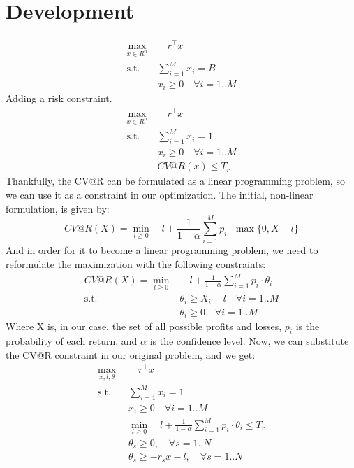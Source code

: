 \documentclass{article}
\begin{document}
\section*{Development}
\begin{equation}
  \begin{aligned}
  \max_{x \in R^n} &\quad \bar{r}^\intercal x\\
  \textrm{s.t.} \quad & \sum_{i=1}^M x_i = B\\
    & x_i \geq 0 \quad \forall i=1..M
  \end{aligned}
\end{equation}
Adding a risk constraint.
\begin{equation}
  \begin{aligned}
  \max_{x \in R^n} &\quad \bar{r}^\intercal x\\
  \textrm{s.t.} \quad & \sum_{i=1}^M x_i = 1\\
    & x_i \geq 0 \quad \forall i=1..M\\
    & CV@R(x) \leq T_r
  \end{aligned}
\end{equation}
Thankfully, the CV@R can be formulated as a linear programming problem, so we can use it as a constraint in our optimization.
The initial, non-linear formulation, is given by:
\begin{equation}
  CV@R(X) = \min_{l \geq 0} \quad l + \frac{1}{1-\alpha} \sum_{i=1}^M p_i \cdot \max\{0, X - l\}
\end{equation}
And in order for it to become a linear programming problem, we need to reformulate the maximization with the following constraints:
\begin{equation}
  \begin{aligned}
    CV@R(X) = \min_{l \geq 0} & \quad l + \frac{1}{1-\alpha} \sum_{i=1}^M p_i \cdot \theta_i\\
    \textrm{s.t.} \quad & \theta_i \geq X_i - l \quad \forall i=1..M\\
    & \theta_i \geq 0 \quad \forall i=1..M
  \end{aligned}
\end{equation}
Where X is, in our case, the set of all possible profits and losses, $p_i$ is the probability of each return, and $\alpha$ is the confidence level.
Now, we can substitute the CV@R constraint in our original problem, and we get:
\begin{equation}
  \begin{aligned}
  \max_{x, l, \theta} &\quad \bar{r}^\intercal x\\
  \textrm{s.t.} \quad & \sum_{i=1}^M x_i = 1\\
    & x_i \geq 0 \quad \forall i=1..M\\
    & \min_{l \geq 0} \quad l + \frac{1}{1-\alpha} \sum_{i=1}^M p_i \cdot \theta_i \leq T_r\\
    & \theta_s \geq 0, \quad \forall s=1..N\\
    & \theta_s \geq -r_sx - l, \quad \forall s=1..N\\
  \end{aligned}
\end{equation}
\end{document}
